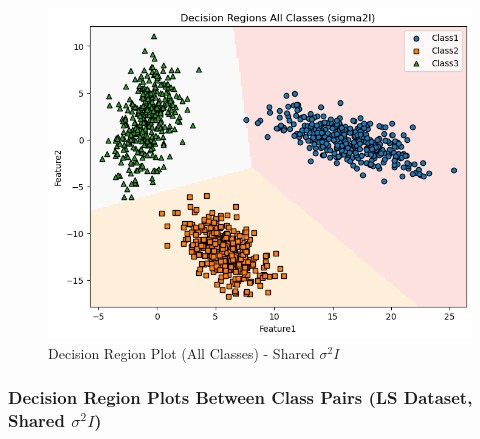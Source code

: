 \begin{figure}[H]
    \centering
    \includegraphics[width=\linewidth]{images/LS_Group04_images/01_sigma2i/05_decision_region_all.png}
    \caption{Decision Region Plot (All Classes) - Shared $\sigma^2 I$}
\end{figure}

\subsubsection{Decision Region Plots Between Class Pairs (LS Dataset, Shared $\sigma^2 I$)}

